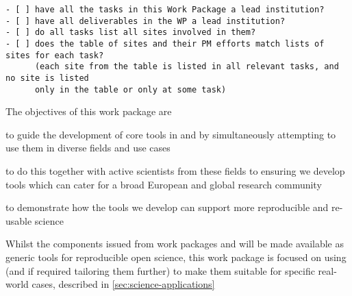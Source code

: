 \begin{draft}
\begin{verbatim}
- [ ] have all the tasks in this Work Package a lead institution?
- [ ] have all deliverables in the WP a lead institution?
- [ ] do all tasks list all sites involved in them?
- [ ] does the table of sites and their PM efforts match lists of sites for each task?
      (each site from the table is listed in all relevant tasks, and no site is listed
      only in the table or only at some task)
\end{verbatim}
\end{draft}

\begin{workpackage}[
  id=applications,
  wphases=0-36!1.11,
  swsites,
  title=Applications and use cases,
  short=Applications,
  lead=MP,
  MPRM=15,
  SRLRM=3,
  UIORM=8,
  IFRRM=14
]

\begin{wpobjectives}
  The objectives of this work package are
 \begin{compactitem}
 \item to guide the development of core tools in  and 
   by simultaneously attempting to use  them in diverse fields and use cases
 \item to do this together with active scientists from these fields to ensuring we develop tools
   which can cater for a broad European and global research community
 \item to demonstrate how the tools we develop can support more reproducible and
   re-usable science
   \end{compactitem}
\end{wpobjectives}

\begin{wpdescription}

  Whilst the components issued from work packages   and  will be
  made available as generic tools for reproducible open science,
  this work package is focused on using (and if required tailoring them further)
  to make them suitable for specific real-world cases, described in \ref{sec:science-applications}


\end{wpdescription}
\end{workpackage}
